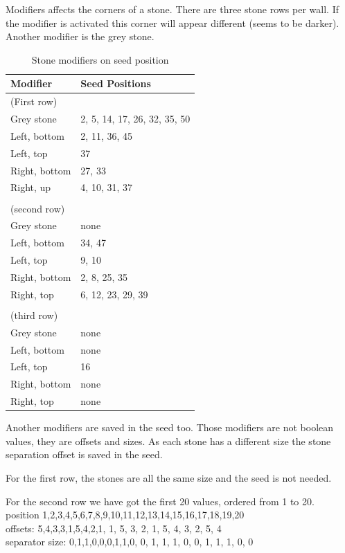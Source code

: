 \documentclass{article}
\begin{document}
 Modifiers affects the corners of a stone. There are three stone rows per
 wall. If the modifier is activated this corner will appear different
 (seems to be darker). Another modifier is the grey stone.

\begin{table}
\begin{tabular}{ll}
\hline
 Modifier      & Seed Positions \\
\hline
 (First row) \\
\hline
 Grey stone    & 2, 5, 14, 17, 26, 32, 35, 50 \\
 Left, bottom  & 2, 11, 36, 45 \\
 Left, top     & 37 \\
 Right, bottom & 27, 33 \\
 Right, up     & 4, 10, 31, 37 \\
 \\
\hline
 (second row) \\
\hline
 Grey stone    & none  \\
 Left, bottom  & 34, 47 \\
 Left, top     & 9, 10 \\
 Right, bottom & 2, 8, 25, 35 \\
 Right, top    & 6, 12, 23, 29, 39 \\
 \\
\hline
 (third row) \\
\hline
 Grey stone    & none  \\
 Left, bottom  & none \\
 Left, top     & 16 \\
 Right, bottom & none \\
 Right, top    & none \\
\hline
\end{tabular}
\caption{Stone modifiers on seed position}
\label{seeds}
\end{table}

 Another modifiers are saved in the seed too. Those modifiers are not
 boolean values, they are offsets and sizes. As each stone has a different
 size the stone separation offset is saved in the seed.

 For the first row, the stones are all the same size and the seed is not
 needed.

 For the second row we have got the first 20 values, ordered from 1 to 20. \\ 
 position        1,2,3,4,5,6,7,8,9,10,11,12,13,14,15,16,17,18,19,20 \\
 offsets:        5,4,3,3,1,5,4,2,1, 1, 5, 3, 2, 1, 5, 4, 3, 2, 5, 4 \\
 separator size: 0,1,1,0,0,0,1,1,0, 0, 1, 1, 1, 0, 0, 1, 1, 1, 0, 0 \\
\end{document}
